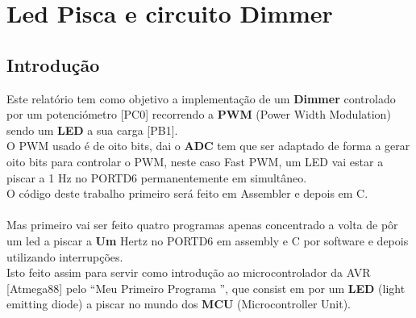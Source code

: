 \documentclass[titlepage, a4paper, 10pt, reqno, openany]{report}
\begin{document}
\renewcommand\thesection{\arabic{section}}
\renewcommand\thesubsection{\thesection.\arabic{subsection}}
\renewcommand\thesubsubsection{\thesection.\thesubsection.\arabic{subsubsection}}
\pagestyle{plain}%
\chapter*{Led Pisca e circuito Dimmer}
\section{Introdu\c{c}\~{a}o}

Este relat\'{o}rio tem como objetivo a implementa\c{c}\~{a}o de um {\bf Dimmer} controlado por um potenci\'{o}metro [PC0] recorrendo a {\bf PWM} (Power Width Modulation) sendo um {\bf LED} a sua carga [PB1]. \\
O PWM usado \'{e} de oito bits, dai o {\bf ADC} tem que ser adaptado de forma a gerar oito bits para controlar o PWM, neste caso Fast PWM, um LED vai estar a piscar a 1 Hz no PORTD6 permanentemente em simult\^{a}neo. \\
O c\'{o}digo deste trabalho primeiro ser\'{a} feito em Assembler e depois em C. 
\\
\\
Mas primeiro vai ser feito quatro programas apenas concentrado a volta de pôr um led a piscar a {\bf Um} Hertz no PORTD6 em assembly e C por software e depois utilizando interrupções.\\
Isto feito assim para servir como introdução ao microcontrolador da AVR [Atmega88] pelo \textquotedblleft Meu Primeiro Programa \textquotedblright, que consist em por um {\bf LED} (light emitting diode) a piscar no mundo dos {\bf MCU} (Microcontroller Unit). \par
\end{document}
